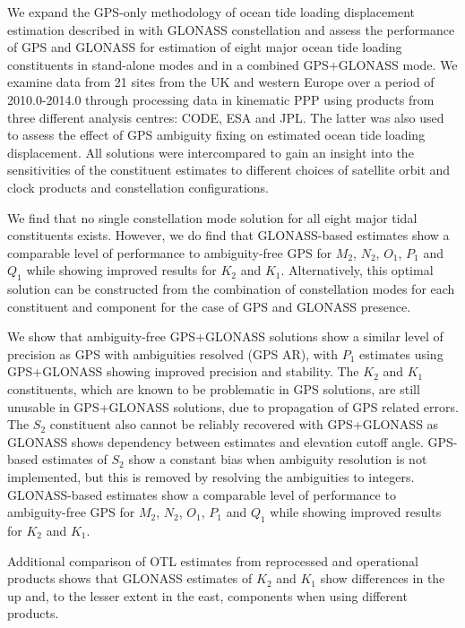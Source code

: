 \documentclass[se, manuscript]{copernicus}
\begin{document}
\conclusions %
We expand the GPS-only methodology of ocean tide loading displacement estimation described in \cite{Penna2015} with GLONASS constellation and assess the performance of GPS and GLONASS for estimation of eight major ocean tide loading constituents in stand-alone modes and in a combined GPS+GLONASS mode. We examine data from 21 sites from the UK and western Europe over a period of 2010.0-2014.0 through processing data in kinematic PPP using products from three different analysis centres: CODE, ESA and JPL. The latter was also used to assess the effect of GPS ambiguity fixing on estimated ocean tide loading displacement. All solutions were intercompared to gain an insight into the sensitivities of the constituent estimates to different choices of satellite orbit and clock products and constellation configurations.

We find that no single constellation mode solution for all eight major tidal constituents exists. However, we do find that GLONASS-based estimates show a comparable level of performance to ambiguity-free GPS for $M_2$, $N_2$, $O_1$, $P_1$ and $Q_1$ while showing improved results for $K_2$ and $K_1$. Alternatively, this optimal solution can be constructed from the combination of constellation modes for each constituent and component for the case of GPS and GLONASS presence.

We show that ambiguity-free GPS+GLONASS solutions show a similar level of precision as GPS with ambiguities resolved (GPS AR), with $P_1$ estimates using GPS+GLONASS showing improved precision and stability. The $K_2$ and $K_1$ constituents, which are known to be problematic in GPS solutions, are still unusable in GPS+GLONASS solutions, due to propagation of GPS related errors. The $S_2$ constituent also cannot be reliably recovered with GPS+GLONASS as GLONASS shows dependency between estimates and elevation cutoff angle. GPS-based estimates of $S_2$ show a constant bias when ambiguity resolution is not implemented, but this is removed by resolving the ambiguities to integers. GLONASS-based estimates show a comparable level of performance to ambiguity-free GPS for $M_2$, $N_2$, $O_1$, $P_1$ and $Q_1$ while showing improved results for $K_2$ and $K_1$.

Additional comparison of OTL estimates from reprocessed and operational products shows that GLONASS estimates of $K_2$ and $K_1$ show differences in the up and, to the lesser extent in the east, components when using different products.
\end{document}
